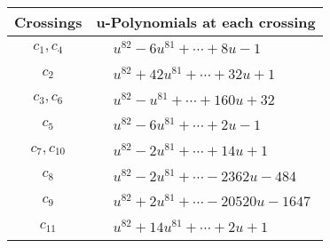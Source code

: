 \documentclass[1p]{elsarticle_modified}
\theoremstyle{definition}
\begin{document}
\begin{tabular}{m{50pt}|m{274pt}}
Crossings & \hspace{64pt}u-Polynomials at each crossing \\
\hline $$\begin{aligned}c_{1},c_{4}\end{aligned}$$&$\begin{aligned}
&u^{82}-6 u^{81}+\cdots+8 u-1
\end{aligned}$\\
\hline $$\begin{aligned}c_{2}\end{aligned}$$&$\begin{aligned}
&u^{82}+42 u^{81}+\cdots+32 u+1
\end{aligned}$\\
\hline $$\begin{aligned}c_{3},c_{6}\end{aligned}$$&$\begin{aligned}
&u^{82}- u^{81}+\cdots+160 u+32
\end{aligned}$\\
\hline $$\begin{aligned}c_{5}\end{aligned}$$&$\begin{aligned}
&u^{82}-6 u^{81}+\cdots+2 u-1
\end{aligned}$\\
\hline $$\begin{aligned}c_{7},c_{10}\end{aligned}$$&$\begin{aligned}
&u^{82}-2 u^{81}+\cdots+14 u+1
\end{aligned}$\\
\hline $$\begin{aligned}c_{8}\end{aligned}$$&$\begin{aligned}
&u^{82}-2 u^{81}+\cdots-2362 u-484
\end{aligned}$\\
\hline $$\begin{aligned}c_{9}\end{aligned}$$&$\begin{aligned}
&u^{82}+2 u^{81}+\cdots-20520 u-1647
\end{aligned}$\\
\hline $$\begin{aligned}c_{11}\end{aligned}$$&$\begin{aligned}
&u^{82}+14 u^{81}+\cdots+2 u+1
\end{aligned}$\\
\hline
\end{tabular}\\~\\
\end{document}
